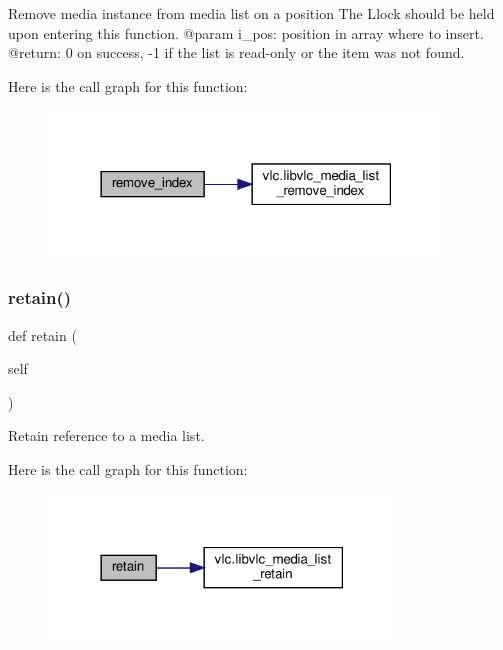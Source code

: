 \begin{DoxyVerb}Remove media instance from media list on a position
The L{lock} should be held upon entering this function.
@param i_pos: position in array where to insert.
@return: 0 on success, -1 if the list is read-only or the item was not found.
\end{DoxyVerb}
 Here is the call graph for this function\+:
\nopagebreak
\begin{figure}[H]
\begin{center}
\leavevmode
\includegraphics[width=297pt]{classvlc_1_1_media_list_a44a92e05fc0eb945272ce4cf075779c5_cgraph}
\end{center}
\end{figure}
\mbox{\label{classvlc_1_1_media_list_a6394d82a0b79f0f91bb059d20ab43490}} 
\subsubsection{\texorpdfstring{retain()}{retain()}}
{\footnotesize\ttfamily def retain (\begin{DoxyParamCaption}\item[{}]{self }\end{DoxyParamCaption})}

\begin{DoxyVerb}Retain reference to a media list.
\end{DoxyVerb}
 Here is the call graph for this function\+:
\nopagebreak
\begin{figure}[H]
\begin{center}
\leavevmode
\includegraphics[width=261pt]{classvlc_1_1_media_list_a6394d82a0b79f0f91bb059d20ab43490_cgraph}
\end{center}
\end{figure}
\mbox{\label{classvlc_1_1_media_list_a8d4d4151676c2941cdd0cee4e25648c5}} 
